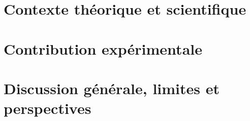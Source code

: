 \documentclass[11pt, a4paper, french, singlespacing, headsepline, reqno]{
MastersDoctoralThesis}
\begin{document}
\frontmatter

\pagestyle{plain}


% 
% 
% 
% 
% 
% 

\tableofcontents 

\mainmatter 



\pagestyle{thesis} 

\part{Contexte théorique et scientifique}



\part{Contribution expérimentale}




\part{Discussion générale, limites et perspectives}



\footnotesize



\listoffigures
{}
\listoftables
{}


% 
\end{document}
